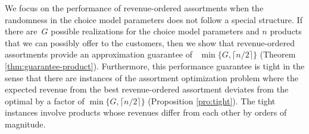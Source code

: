 We focus on the performance of revenue-ordered assortments when the randomness in the choice model parameters does not follow a special structure. If there are~$G$ possible realizations for the choice model parameters and $n$ products that we can possibly offer to the customers, then we show that revenue-ordered assortments provide an approximation guarantee of ~$\min\{G, \lceil n/2 \rceil\}$ (Theorem \ref{thm:guarantee-product}). Furthermore, this performance guarantee is tight in the sense that there are instances of the assortment optimization problem where the expected revenue from the best revenue-ordered assortment deviates from the optimal by a factor of $\min\{G, \lceil n/2 \rceil\}$ (Proposition \ref{pro:tight}).  The tight instances involve products whose revenues differ from each other by orders of magnitude.


